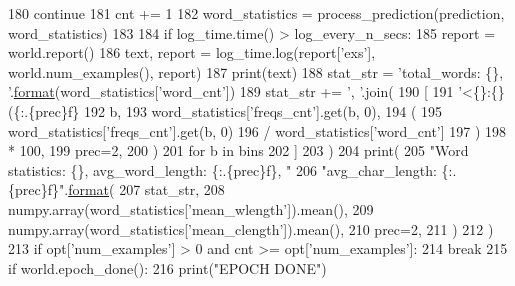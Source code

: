 \begin{DoxyCode}
180                     \textcolor{keywordflow}{continue}
181                 cnt += 1
182                 word\_statistics = process\_prediction(prediction, word\_statistics)
183 
184         \textcolor{keywordflow}{if} log\_time.time() > log\_every\_n\_secs:
185             report = world.report()
186             text, report = log\_time.log(report[\textcolor{stringliteral}{'exs'}], world.num\_examples(), report)
187             print(text)
188             stat\_str = \textcolor{stringliteral}{'total\_words: \{\}, '}.\hyperlink{namespaceparlai_1_1chat__service_1_1services_1_1messenger_1_1shared__utils_a32e2e2022b824fbaf80c747160b52a76}{format}(word\_statistics[\textcolor{stringliteral}{'word\_cnt'}])
189             stat\_str += \textcolor{stringliteral}{', '}.join(
190                 [
191                     \textcolor{stringliteral}{'<\{\}:\{\} (\{:.\{prec\}f\}%
192                         b,
193                         word\_statistics[\textcolor{stringliteral}{'freqs\_cnt'}].get(b, 0),
194                         (
195                             word\_statistics[\textcolor{stringliteral}{'freqs\_cnt'}].get(b, 0)
196                             / word\_statistics[\textcolor{stringliteral}{'word\_cnt'}]
197                         )
198                         * 100,
199                         prec=2,
200                     )
201                     \textcolor{keywordflow}{for} b \textcolor{keywordflow}{in} bins
202                 ]
203             )
204             print(
205                 \textcolor{stringliteral}{"Word statistics: \{\}, avg\_word\_length: \{:.\{prec\}f\}, "}
206                 \textcolor{stringliteral}{"avg\_char\_length: \{:.\{prec\}f\}"}.\hyperlink{namespaceparlai_1_1chat__service_1_1services_1_1messenger_1_1shared__utils_a32e2e2022b824fbaf80c747160b52a76}{format}(
207                     stat\_str,
208                     numpy.array(word\_statistics[\textcolor{stringliteral}{'mean\_wlength'}]).mean(),
209                     numpy.array(word\_statistics[\textcolor{stringliteral}{'mean\_clength'}]).mean(),
210                     prec=2,
211                 )
212             )
213         \textcolor{keywordflow}{if} opt[\textcolor{stringliteral}{'num\_examples'}] > 0 \textcolor{keywordflow}{and} cnt >= opt[\textcolor{stringliteral}{'num\_examples'}]:
214             \textcolor{keywordflow}{break}
215     \textcolor{keywordflow}{if} world.epoch\_done():
216         print(\textcolor{stringliteral}{"EPOCH DONE"})
}
\end{DoxyCode}

